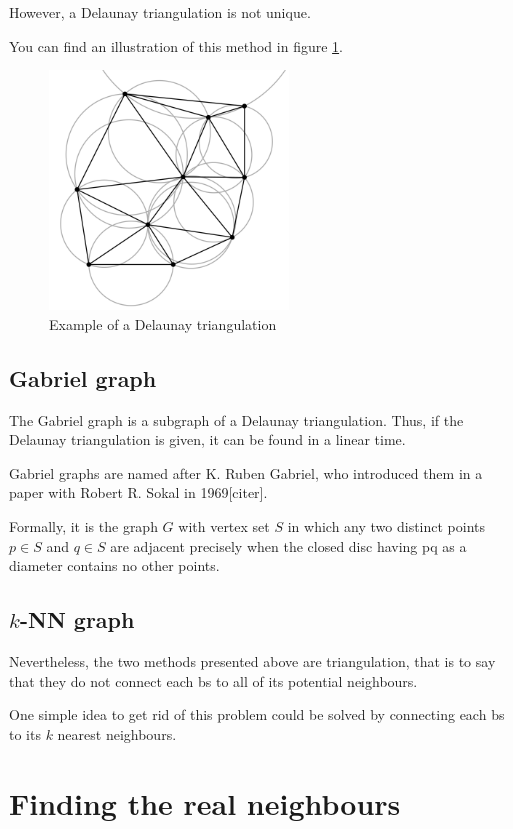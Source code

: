 \documentclass[lettersize,journal,english]{IEEEtran}
\begin{document}
However, a Delaunay triangulation is not unique.

You can find an illustration of this method in figure \ref{del_tri}.
\begin{figure}[!t]
    \centering
    \includegraphics[width=2.5in]{images/illus_graphs/Delaunay_circumcircles_vectorial.svg.png}
    \caption{Example of a Delaunay triangulation}
    \label{del_tri}
\end{figure}

\subsection{Gabriel graph}
\noindent The Gabriel graph is a subgraph of a Delaunay triangulation. Thus, if the Delaunay triangulation is given, it can be found in a linear time. 

Gabriel graphs are named after K. Ruben Gabriel, who introduced them in a paper with Robert R. Sokal in 1969[citer].

Formally, it is the graph $G$ with vertex set $S$ in which any two distinct points $p\in S$ and $q\in S$ are adjacent precisely when the closed disc having pq as a diameter contains no other points.

\subsection{$k$-NN graph}
\noindent Nevertheless, the two methods presented above are triangulation, that is to say that they do not connect each \acrshort{bs} to all of its potential neighbours.

One simple idea to get rid of this problem could be solved by connecting each \acrshort{bs} to its $k$ nearest neighbours.

\section{Finding the real neighbours}
\end{document}
